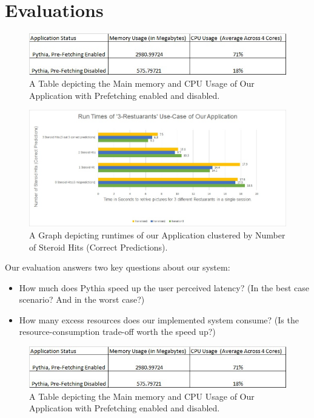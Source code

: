 \section{Evaluations}
\label{sec:eval}

\begin{figure}
  \includegraphics[width=\linewidth]{applicationResourceUsageTable1.jpg}
  \caption{A Table depicting the Main memory and CPU Usage of Our Application with Prefetching enabled and disabled.}
  \label{fig:table1}
\end{figure}

\begin{figure}
  \includegraphics[width=\linewidth]{runTimeChart1.jpg}
  \caption{A Graph depicting runtimes of our Application clustered by Number of Steroid Hits (Correct Predictions).}
  \label{fig:graph1}
\end{figure}


Our evaluation answers two key questions about our system:
\begin{itemize}
\item How much does Pythia speed up the user perceived latency? (In the best case scenario? And in the worst case?)
\item How many excess resources does our implemented system consume? (Is the resource-consumption trade-off worth the speed up?)
\end{itemize}

\begin{figure}
  \includegraphics[width=\linewidth]{figs/applicationResourceUsageTable1.jpg}
  \caption{A Table depicting the Main memory and CPU Usage of Our Application with Prefetching enabled and disabled.}
  \label{fig:table1}
\end{figure}

